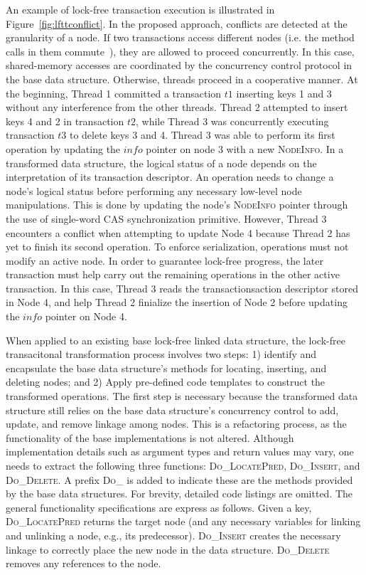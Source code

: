 An example of lock-free transaction execution is illustrated in Figure~\ref{fig:lfttconflict}.
In the proposed approach, conflicts are detected at the granularity of a node. 
If two transactions access different nodes (i.e. the method calls in them commute~\cite{herlihy2008transactional}), they are allowed to proceed concurrently. 
In this case, shared-memory accesses are coordinated by the concurrency control protocol in the base data structure.
Otherwise, threads proceed in a cooperative manner.
At the beginning, Thread 1 committed a transaction $t1$ inserting keys 1 and 3 without any interference from the other threads. 
Thread 2 attempted to insert keys 4 and 2 in transaction $t2$, while Thread 3 was concurrently executing transaction $t3$ to delete keys 3 and 4.
Thread 3 was able to perform its first operation by updating the $info$ pointer on node 3 with a new \textsc{NodeInfo}.
In a transformed data structure, the logical status of a node depends on the interpretation of its transaction descriptor. 
An operation needs to change a node's logical status before performing any necessary low-level node manipulations. 
This is done by updating the node's \textsc{NodeInfo} pointer through the use of single-word CAS synchronization primitive. 
However, Thread 3 encounters a conflict when attempting to update Node 4 because Thread 2 has yet to finish its second operation.
To enforce serialization, operations must not modify an active node. 
In order to guarantee lock-free progress, the later transaction must help carry out the remaining operations in the other active transaction.
In this case, Thread 3 reads the transactionsaction descriptor stored in Node 4, and help Thread 2 finialize the insertion of Node 2 before updating the $info$ pointer on Node 4.

When applied to an existing base lock-free linked data structure, the lock-free transacitonal transformation process involves two steps: 1) identify and encapsulate the base data structure's methods for locating, inserting, and deleting nodes; and 2) Apply pre-defined code templates to construct the transformed operations.
The first step is necessary because the transformed data structure still relies on the base data structure's concurrency control to add, update, and remove linkage among nodes.
This is a refactoring process, as the functionality of the base implementations is not altered. 
Although implementation details such as argument types and return values may vary, one needs to extract the following three functions: \textsc{Do\_LocatePred}, \textsc{Do\_Insert}, and \textsc{Do\_Delete}.
A prefix \textsc{Do\_} is added to indicate these are the methods provided by the base data structures.
For brevity, detailed code listings are omitted. 
The general functionality specifications are express as follows. 
Given a key, \textsc{Do\_LocatePred} returns the target node (and any necessary variables for linking and unlinking a node, e.g., its predecessor).
\textsc{Do\_Insert} creates the necessary linkage to correctly place the new node in the data structure.
\textsc{Do\_Delete} removes any references to the node.

